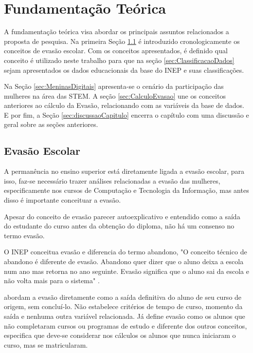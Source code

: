 \chapter{Fundamentação Teórica}\label{cap:FundamentacaoTeorica}

A fundamentação teórica visa abordar os principais assuntos relacionados a proposta de pesquisa. Na primeira Seção \ref{sec:ConceitosEvasao} é introduzido cronologicamente os conceitos de evasão escolar. Com os conceitos apresentados, é definido qual conceito é utilizado neste trabalho para que na seção \ref{sec:ClassificacaoDados} sejam apresentados os dados educacionais da base do INEP  e suas classificações. 

Na Seção \ref{sec:MeninasDigitais} apresenta-se o cenário da participação das mulheres na área das STEM. A seção \ref{sec:CalculoEvasao} une os conceitos anteriores ao cálculo da Evasão, relacionando com as variáveis da base de dados. E por fim, a Seção \ref{sec:discussaoCapitulo} encerra o capítulo com uma discussão e geral sobre as seções anteriores.


\section{Evasão Escolar}\label{sec:ConceitosEvasao}
A permanência no ensino superior está diretamente ligada a evasão escolar, para isso, faz-se necessário trazer análises relacionadas a evasão das mulheres, especificamente nos cursos de Computação e Tecnologia da Informação, mas antes disso é importante conceituar a evasão.

Apesar do conceito de evasão parecer autoexplicativo e entendido como a saída do estudante do curso antes da obtenção do diploma, não há um consenso no termo evasão. %


O INEP conceitua evasão e diferencia do termo abandono, "O conceito técnico de abandono é diferente de evasão. Abandono quer dizer que o aluno deixa a escola num ano mas retorna no ano seguinte. Evasão significa que o aluno sai da escola e não volta mais para o sistema" \cite{estatistica:2014}.

 abordam a evasão diretamente como a saída definitiva do aluno de seu curso de origem, sem concluí-lo. Não estabelece critérios de tempo de curso, momento da saída e nenhuma outra variável relacionada. Já  define evasão como os alunos que não completaram cursos ou programas de estudo e diferente dos outros conceitos, especifica que deve-se considerar nos cálculos os alunos que nunca iniciaram o curso, mas se matricularam. 

